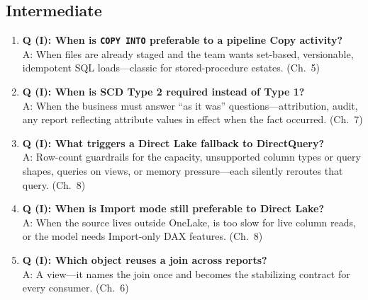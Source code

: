 \subsection*{Intermediate}
\begin{enumerate}
    \item \textbf{Q (I): When is \texttt{COPY INTO} preferable to a pipeline Copy activity?}\\
    A: When files are already staged and the team wants set-based, versionable, idempotent SQL
    loads---classic for stored-procedure estates. (Ch.~5)
    \item \textbf{Q (I): When is SCD Type 2 required instead of Type 1?}\\
    A: When the business must answer ``as it was'' questions---attribution, audit, any report
    reflecting attribute values in effect when the fact occurred. (Ch.~7)
    \item \textbf{Q (I): What triggers a Direct Lake fallback to DirectQuery?}\\
    A: Row-count guardrails for the capacity, unsupported column types or query shapes, queries
    on views, or memory pressure---each silently reroutes that query. (Ch.~8)
    \item \textbf{Q (I): When is Import mode still preferable to Direct Lake?}\\
    A: When the source lives outside OneLake, is too slow for live column reads, or the model
    needs Import-only DAX features. (Ch.~8)
    \item \textbf{Q (I): Which object reuses a join across reports?}\\
    A: A view---it names the join once and becomes the stabilizing contract for every consumer.
    (Ch.~6)
\end{enumerate}

